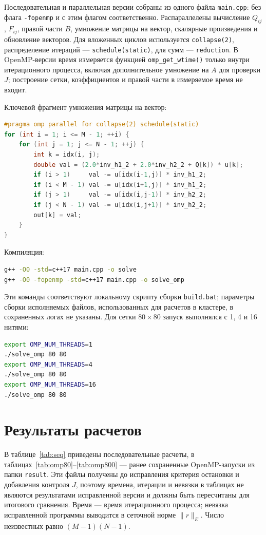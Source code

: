 \documentclass[12pt,a4paper]{article}
\begin{document}
Последовательная и параллельная версии собраны из одного файла \texttt{main.cpp}: без флага \texttt{-fopenmp} и с этим флагом соответственно. Распараллелены вычисление \(Q_{ij}\), \(F_{ij}\), правой части \(B\), умножение матрицы на вектор, скалярные произведения и обновление векторов. Для вложенных циклов используется \texttt{collapse(2)}, распределение итераций — \texttt{schedule(static)}, для сумм — \texttt{reduction}. В OpenMP-версии время измеряется функцией \texttt{omp\_get\_wtime()} только внутри итерационного процесса, включая дополнительное умножение на \(A\) для проверки \(J\); построение сетки, коэффициентов и правой части в измеряемое время не входит.

Ключевой фрагмент умножения матрицы на вектор:
\begin{lstlisting}[language=C++]
#pragma omp parallel for collapse(2) schedule(static)
for (int i = 1; i <= M - 1; ++i) {
    for (int j = 1; j <= N - 1; ++j) {
        int k = idx(i, j);
        double val = (2.0*inv_h1_2 + 2.0*inv_h2_2 + Q[k]) * u[k];
        if (i > 1)     val -= u[idx(i-1,j)] * inv_h1_2;
        if (i < M - 1) val -= u[idx(i+1,j)] * inv_h1_2;
        if (j > 1)     val -= u[idx(i,j-1)] * inv_h2_2;
        if (j < N - 1) val -= u[idx(i,j+1)] * inv_h2_2;
        out[k] = val;
    }
}
\end{lstlisting}

Компиляция:
\begin{lstlisting}[language=bash]
g++ -O0 -std=c++17 main.cpp -o solve
g++ -O0 -fopenmp -std=c++17 main.cpp -o solve_omp
\end{lstlisting}
Эти команды соответствуют локальному скрипту сборки \texttt{build.bat}; параметры сборки исполняемых файлов, использованных для расчетов в кластере, в сохраненных логах не указаны.
Для сетки \(80\times80\) запуск выполнялся с 1, 4 и 16 нитями:
\begin{lstlisting}[language=bash]
export OMP_NUM_THREADS=1
./solve_omp 80 80
export OMP_NUM_THREADS=4
./solve_omp 80 80
export OMP_NUM_THREADS=16
./solve_omp 80 80
\end{lstlisting}

\section{Результаты расчетов}

В таблице~\ref{tab:seq} приведены последовательные расчеты, в таблицах~\ref{tab:omp80}--\ref{tab:omp800} — ранее сохраненные OpenMP-запуски из папки \texttt{result}. Эти файлы получены до исправления критерия остановки и добавления контроля \(J\), поэтому времена, итерации и невязки в таблицах не являются результатами исправленной версии и должны быть пересчитаны для итогового сравнения. Время — время итерационного процесса; невязка исправленной программы выводится в сеточной норме \(\|r\|_E\). Число неизвестных равно \((M-1)(N-1)\).
\end{document}
